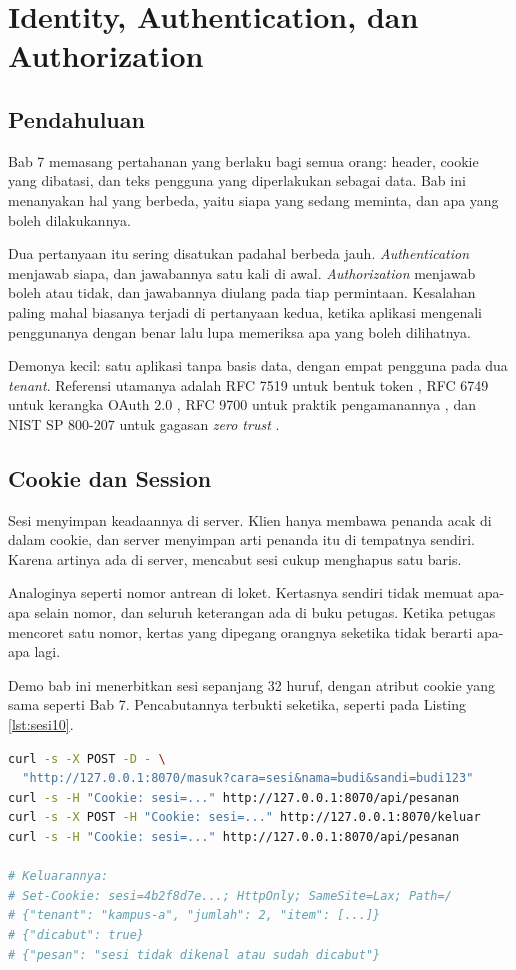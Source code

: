\chapter{Identity, Authentication, dan Authorization}
\label{ch:identitas}

\section{Pendahuluan}

Bab 7 memasang pertahanan yang berlaku bagi semua orang: header, cookie yang
dibatasi, dan teks pengguna yang diperlakukan sebagai data. Bab ini
menanyakan hal yang berbeda, yaitu siapa yang sedang meminta, dan apa yang
boleh dilakukannya.

Dua pertanyaan itu sering disatukan padahal berbeda jauh.
\textit{Authentication} menjawab siapa, dan jawabannya satu kali di awal.
\textit{Authorization} menjawab boleh atau tidak, dan jawabannya diulang pada
tiap permintaan. Kesalahan paling mahal biasanya terjadi di pertanyaan kedua,
ketika aplikasi mengenali penggunanya dengan benar lalu lupa memeriksa apa
yang boleh dilihatnya.

Demonya kecil: satu aplikasi tanpa basis data, dengan empat pengguna pada dua
\textit{tenant}. Referensi utamanya adalah RFC 7519 untuk bentuk token
\cite{rfc7519}, RFC 6749 untuk kerangka OAuth 2.0 \cite{rfc6749}, RFC 9700
untuk praktik pengamanannya \cite{rfc9700}, dan NIST SP 800-207 untuk
gagasan \textit{zero trust} \cite{nist-zero-trust}.

\section{Cookie dan Session}

Sesi menyimpan keadaannya di server. Klien hanya membawa penanda acak di
dalam cookie, dan server menyimpan arti penanda itu di tempatnya sendiri.
Karena artinya ada di server, mencabut sesi cukup menghapus satu baris.

Analoginya seperti nomor antrean di loket. Kertasnya sendiri tidak memuat
apa-apa selain nomor, dan seluruh keterangan ada di buku petugas. Ketika
petugas mencoret satu nomor, kertas yang dipegang orangnya seketika tidak
berarti apa-apa lagi.

Demo bab ini menerbitkan sesi sepanjang 32 huruf, dengan atribut cookie yang
sama seperti Bab 7. Pencabutannya terbukti seketika, seperti pada Listing
\ref{lst:sesi10}.

\begin{lstlisting}[language=bash, caption={Sesi dicabut seketika saat keluar, tersedia di \berkas{sources/chapter10/aplikasi.py}}, label={lst:sesi10}]
curl -s -X POST -D - \
  "http://127.0.0.1:8070/masuk?cara=sesi&nama=budi&sandi=budi123"
curl -s -H "Cookie: sesi=..." http://127.0.0.1:8070/api/pesanan
curl -s -X POST -H "Cookie: sesi=..." http://127.0.0.1:8070/keluar
curl -s -H "Cookie: sesi=..." http://127.0.0.1:8070/api/pesanan

# Keluarannya:
# Set-Cookie: sesi=4b2f8d7e...; HttpOnly; SameSite=Lax; Path=/
# {"tenant": "kampus-a", "jumlah": 2, "item": [...]}
# {"dicabut": true}
# {"pesan": "sesi tidak dikenal atau sudah dicabut"}
\end{lstlisting}

